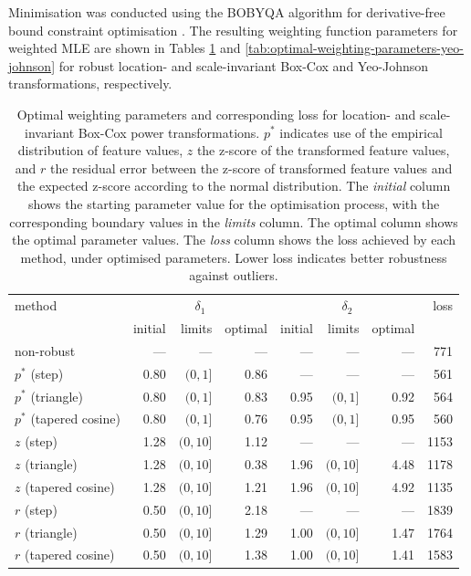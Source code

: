\documentclass[preprint,12pt,authoryear]{elsarticle}
\begin{document}
Minimisation was conducted using the BOBYQA algorithm for
derivative-free bound constraint optimisation \citep{Powell2009-zb}. The
resulting weighting function parameters for weighted MLE are shown in
Tables \ref{tab:optimal-weighting-parameters-box-cox} and
\ref{tab:optimal-weighting-parameters-yeo-johnson} for robust location-
and scale-invariant Box-Cox and Yeo-Johnson transformations,
respectively.

\begin{table}
\begin{center}
\caption{Optimal weighting parameters and corresponding loss for location- and scale-invariant Box-Cox power transformations. $p^{*}$ indicates use of the empirical distribution of feature values, $z$ the z-score of the transformed feature values, and $r$ the residual error between the z-score of transformed feature values and the expected z-score according to the normal distribution. The \textit{initial} column shows the starting parameter value for the optimisation process, with the corresponding boundary values in the \textit{limits} column. The {optimal} column shows the optimal parameter values. The \textit{loss} column shows the loss achieved by each method, under optimised parameters. Lower loss indicates better robustness against outliers.}
\label{tab:optimal-weighting-parameters-box-cox}
\begin{tabular}{l r r r r r r r}

\toprule
method & \multicolumn{3}{c}{$\delta_1$} & \multicolumn{3}{c}{$\delta_2$} & loss \\
& initial & limits & optimal & initial & limits & optimal & \\

\midrule
non-robust               & ---  & ---       & ---  & ---  & ---       & ---  & 771 \\
$p^{*}$ (step)           & 0.80 & $(0, 1]$  & 0.86 & ---  & ---       & ---  & 561 \\
$p^{*}$ (triangle)       & 0.80 & $(0, 1]$  & 0.83 & 0.95 & $(0, 1]$  & 0.92 & 564 \\
$p^{*}$ (tapered cosine) & 0.80 & $(0, 1]$  & 0.76 & 0.95 & $(0, 1]$  & 0.95 & 560 \\
$z$ (step)               & 1.28 & $(0, 10]$ & 1.12 & ---  & ---       & ---  & 1153 \\
$z$ (triangle)           & 1.28 & $(0, 10]$ & 0.38 & 1.96 & $(0, 10]$ & 4.48 & 1178 \\
$z$ (tapered cosine)     & 1.28 & $(0, 10]$ & 1.21 & 1.96 & $(0, 10]$ & 4.92 & 1135 \\
$r$ (step)               & 0.50 & $(0, 10]$ & 2.18 & ---  & ---       & ---  & 1839 \\
$r$ (triangle)           & 0.50 & $(0, 10]$ & 1.29 & 1.00 & $(0, 10]$ & 1.47 & 1764 \\
$r$ (tapered cosine)     & 0.50 & $(0, 10]$ & 1.38 & 1.00 & $(0, 10]$ & 1.41 & 1583 \\
\bottomrule
\end{tabular}
\end{center}
\end{table}
\end{document}
